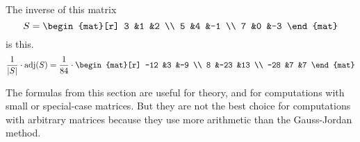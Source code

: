 \documentclass[10pt,t]{beamer}
\begin{document}
\begin{frame}
\ex  
The inverse of this matrix 
\begin{equation*}
  S=
  \begin{mat}[r]
    3 &1 &2 \\
    5 &4 &-1 \\
    7 &0 &-3
  \end{mat}
\end{equation*}
is this.
\begin{equation*}
  \frac{1}{\deter{S}}\cdot\adj(S)
  =
  \frac{1}{84}
  \cdot
  \begin{mat}[r]
    -12 &3   &-9 \\
      8 &-23 &13 \\
    -28 &7   &7    
  \end{mat}
\end{equation*}

\pause
\medskip
\no
The formulas from this section are useful for theory, and for
computations with small or special-case matrices.
But they are
not the best choice for computations with arbitrary matrices
because they use more arithmetic than the 
Gauss-Jordan method.
\end{frame}



% 
\end{document}
